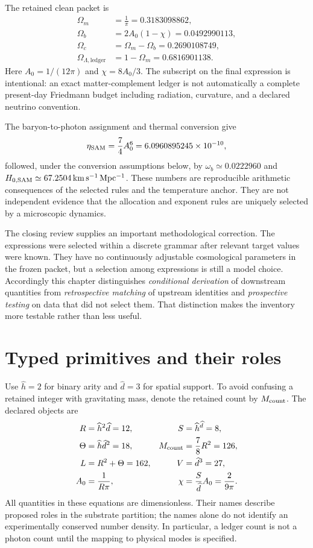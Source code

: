 The retained clean packet is
\begin{align}
 \Omega_m&=\frac1\pi=0.3183098862,\label{c8:om}\\
 \Omega_b&=2A_0(1-\chi)=0.0492990113,\label{c8:ob}\\
 \Omega_c&=\Omega_m-\Omega_b=0.2690108749,\label{c8:oc}\\
 \Omega_{\Lambda,\mathrm{ledger}}&=1-\Omega_m=0.6816901138.
 \label{c8:ol}
\end{align}
Here $A_0=1/(12\pi)$ and $\chi=8A_0/3$. The subscript on the final expression is intentional: an exact matter-complement ledger is not automatically a complete present-day Friedmann budget including radiation, curvature, and a declared neutrino convention.

The baryon-to-photon assignment and thermal conversion give
\begin{equation}
 \eta_{\rm SAM}=\frac74A_0^6=6.0960895245\times10^{-10},
 \label{c8:eta}
\end{equation}
followed, under the conversion assumptions below, by $\omega_b\simeq0.0222960$ and $H_{0,\rm SAM}\simeq67.2504\,\mathrm{km\,s^{-1}\,Mpc^{-1}}$. These numbers are reproducible arithmetic consequences of the selected rules and the temperature anchor. They are not independent evidence that the allocation and exponent rules are uniquely selected by a microscopic dynamics.

The closing review supplies an important methodological correction. The expressions were selected within a discrete grammar after relevant target values were known. They have no continuously adjustable cosmological parameters in the frozen packet, but a selection among expressions is still a model choice. Accordingly this chapter distinguishes \emph{conditional derivation} of downstream quantities from \emph{retrospective matching} of upstream identities and \emph{prospective testing} on data that did not select them. That distinction makes the inventory more testable rather than less useful.

\section{Typed primitives and their roles}
Use $\widehat h=2$ for binary arity and $\widehat d=3$ for spatial support. To avoid confusing a retained integer with gravitating mass, denote the retained count by $M_{\rm count}$. The declared objects are
\begin{align}
 R&=\widehat h^2\widehat d=12,& S&=\widehat h^{\widehat d}=8,\label{c8:primitive1}\\
 \Theta&=\widehat h\widehat d^2=18,&M_{\rm count}&=\frac78R^2=126,\label{c8:primitive2}\\
 L&=R^2+\Theta=162,&V&=\widehat d^3=27,\label{c8:primitive3}\\
 A_0&=\frac1{R\pi},&\chi&=\frac{S}{\widehat d}A_0=\frac2{9\pi}.
 \label{c8:primitive4}
\end{align}
All quantities in these equations are dimensionless. Their names describe proposed roles in the substrate partition; the names alone do not identify an experimentally conserved number density. In particular, a ledger count is not a photon count until the mapping to physical modes is specified.

